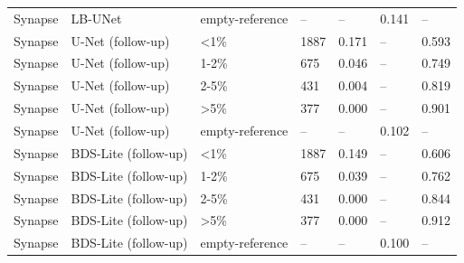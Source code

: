 \begin{longtable}{lllllll}
Synapse & LB-UNet & empty-reference & -- & -- & 0.141 & -- \\
Synapse & U-Net (follow-up) & <1\% & 1887 & 0.171 & -- & 0.593 \\
Synapse & U-Net (follow-up) & 1-2\% & 675 & 0.046 & -- & 0.749 \\
Synapse & U-Net (follow-up) & 2-5\% & 431 & 0.004 & -- & 0.819 \\
Synapse & U-Net (follow-up) & >5\% & 377 & 0.000 & -- & 0.901 \\
Synapse & U-Net (follow-up) & empty-reference & -- & -- & 0.102 & -- \\
Synapse & BDS-Lite (follow-up) & <1\% & 1887 & 0.149 & -- & 0.606 \\
Synapse & BDS-Lite (follow-up) & 1-2\% & 675 & 0.039 & -- & 0.762 \\
Synapse & BDS-Lite (follow-up) & 2-5\% & 431 & 0.000 & -- & 0.844 \\
Synapse & BDS-Lite (follow-up) & >5\% & 377 & 0.000 & -- & 0.912 \\
Synapse & BDS-Lite (follow-up) & empty-reference & -- & -- & 0.100 & -- \\
\bottomrule
\end{longtable}

